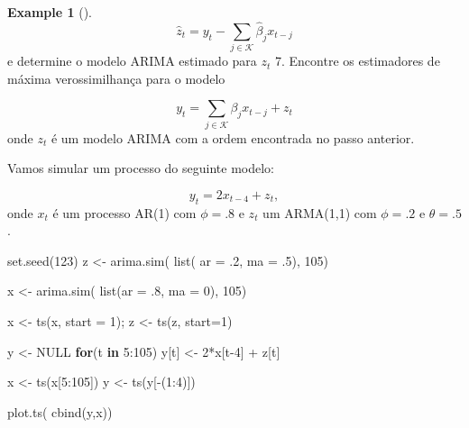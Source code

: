 \documentclass[
  letterpaper,
  DIV=11,
  numbers=noendperiod]{scrartcl}
\newenvironment{Shaded}{\begin{snugshade}}{\end{snugshade}}
\newcommand{\AttributeTok}[1]{\textcolor[rgb]{0.40,0.45,0.13}{#1}}
\newcommand{\ConstantTok}[1]{\textcolor[rgb]{0.56,0.35,0.01}{#1}}
\newcommand{\ControlFlowTok}[1]{\textcolor[rgb]{0.00,0.23,0.31}{\textbf{#1}}}
\newcommand{\DecValTok}[1]{\textcolor[rgb]{0.68,0.00,0.00}{#1}}
\newcommand{\FunctionTok}[1]{\textcolor[rgb]{0.28,0.35,0.67}{#1}}
\newcommand{\NormalTok}[1]{\textcolor[rgb]{0.00,0.23,0.31}{#1}}
\newcommand{\OtherTok}[1]{\textcolor[rgb]{0.00,0.23,0.31}{#1}}
\newcommand{\SpecialCharTok}[1]{\textcolor[rgb]{0.37,0.37,0.37}{#1}}
\theoremstyle{definition}
\newtheorem{example}{Example}[chapter]
\theoremstyle{definition}
\theoremstyle{plain}
\theoremstyle{plain}
\theoremstyle{remark}
\begin{document}
\begin{example}[]
\[\hat{z}_t=y_t-\sum_{j\in\mathcal{K}}\hat{\beta}_j x_{t-j}\] e
determine o modelo ARIMA estimado para \(z_t\) 7. Encontre os
estimadores de máxima verossimilhança para o modelo

\[y_t=\sum_{j\in\mathcal{K}} \beta_j x_{t-j}+z_t\] onde \(z_t\) é um
modelo ARIMA com a ordem encontrada no passo anterior.

\protect{}\label{exm}
Vamos simular um processo do seguinte modelo:

\[y_t = 2x_{t-4}+z_t,\] onde \(x_t\) é um processo AR(1) com \(\phi=.8\)
e \(z_t\) um ARMA(1,1) com \(\phi=.2\) e \(\theta=.5\).

\begin{Shaded}
\begin{Highlighting}[]
\FunctionTok{set.seed}\NormalTok{(}\DecValTok{123}\NormalTok{)}
\NormalTok{z }\OtherTok{\textless{}{-}} \FunctionTok{arima.sim}\NormalTok{( }\FunctionTok{list}\NormalTok{( }\AttributeTok{ar =}\NormalTok{ .}\DecValTok{2}\NormalTok{, }\AttributeTok{ma =}\NormalTok{ .}\DecValTok{5}\NormalTok{), }\DecValTok{105}\NormalTok{)}

\NormalTok{x }\OtherTok{\textless{}{-}} \FunctionTok{arima.sim}\NormalTok{( }\FunctionTok{list}\NormalTok{(}\AttributeTok{ar =}\NormalTok{ .}\DecValTok{8}\NormalTok{, }\AttributeTok{ma =} \DecValTok{0}\NormalTok{), }\DecValTok{105}\NormalTok{)}

\NormalTok{x }\OtherTok{\textless{}{-}} \FunctionTok{ts}\NormalTok{(x, }\AttributeTok{start =} \DecValTok{1}\NormalTok{); z }\OtherTok{\textless{}{-}} \FunctionTok{ts}\NormalTok{(z, }\AttributeTok{start=}\DecValTok{1}\NormalTok{)}

\NormalTok{y }\OtherTok{\textless{}{-}} \ConstantTok{NULL}
\ControlFlowTok{for}\NormalTok{(t }\ControlFlowTok{in} \DecValTok{5}\SpecialCharTok{:}\DecValTok{105}\NormalTok{) y[t] }\OtherTok{\textless{}{-}} \DecValTok{2}\SpecialCharTok{*}\NormalTok{x[t}\DecValTok{{-}4}\NormalTok{] }\SpecialCharTok{+}\NormalTok{ z[t]}

\NormalTok{x }\OtherTok{\textless{}{-}} \FunctionTok{ts}\NormalTok{(x[}\DecValTok{5}\SpecialCharTok{:}\DecValTok{105}\NormalTok{])}
\NormalTok{y }\OtherTok{\textless{}{-}} \FunctionTok{ts}\NormalTok{(y[}\SpecialCharTok{{-}}\NormalTok{(}\DecValTok{1}\SpecialCharTok{:}\DecValTok{4}\NormalTok{)])}

\FunctionTok{plot.ts}\NormalTok{( }\FunctionTok{cbind}\NormalTok{(y,x))}
\end{Highlighting}
\end{Shaded}


\end{example}
\end{document}
